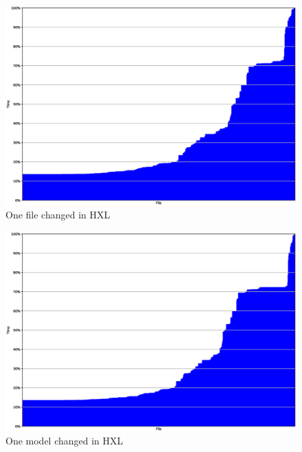 \documentclass{cslthse-msc}
\begin{document}
\begin{figure}[!htbp]
    \centering
    \includegraphics[width=\textwidth]{Graphs/HXL_one_file.eps}
    \caption{One file changed in HXL}
    \label{fig:hxlonefile}
\end{figure}

\begin{figure}[!htbp]
    \centering
    \includegraphics[width=\textwidth]{Graphs/HXL_one_model.eps}
    \caption{One model changed in HXL}
    \label{fig:hxlonemodel}
\end{figure}
\end{document}
